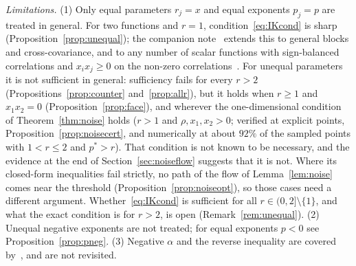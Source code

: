 \documentclass[11pt]{amsart}
\theoremstyle{definition}
\begin{document}
\emph{Limitations.} (1) Only equal parameters $r_j=x$ and equal exponents $p_j=p$ are treated in general. For two
functions and $r=1$, condition~\eqref{eq:IKcond} is sharp (Proposition~\ref{prop:unequal}); the companion
note~\cite{GC} extends this to general blocks and cross-covariance, and to any number of scalar functions with
sign-balanced correlations and $x_ix_j\ge0$ on the non-zero correlations~\cite[Cor.~1.5]{GC}. For unequal parameters
it is not sufficient in general: sufficiency fails for every $r>2$ (Propositions~\ref{prop:counter}
and~\ref{prop:allr}), but it holds when $r\ge1$ and $x_1x_2=0$ (Proposition~\ref{prop:face}), and wherever the
one-dimensional condition of Theorem~\ref{thm:noise} holds ($r>1$ and $\rho,x_1,x_2>0$; verified at explicit points,
Proposition~\ref{prop:noisecert}, and numerically at about $92\%$ of the sampled points with $1<r\le2$ and $p^*>r$).
That condition is not known to be necessary, and the evidence at the end of Section~\ref{sec:noiseflow} suggests that
it is not. Where its closed-form inequalities fail strictly, no path of the flow of Lemma~\ref{lem:noise} comes near
the threshold (Proposition~\ref{prop:noiseopt}), so those cases need a different argument. Whether~\eqref{eq:IKcond}
is sufficient for all $r\in(0,2]\setminus\{1\}$, and what the exact condition is for $r>2$, is open
(Remark~\ref{rem:unequal}). (2) Unequal negative exponents are not treated; for equal
exponents $p<0$ see Proposition~\ref{prop:pneg}. (3) Negative $\alpha$ and the reverse inequality are covered
by~\cite{IK25}, and are not revisited.
\end{document}
